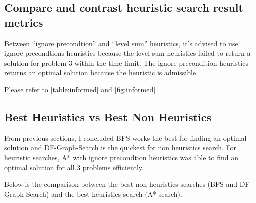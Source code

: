 \documentclass[letterpaper]{article}
\begin{document}
\subsection*{Compare and contrast heuristic search result metrics}
Between ``ignore precondtion'' and ``level sum'' heuristics, it's advised to use ignore precondtions heuristics because the level sum heuristics failed to return a solution for problem 3 within the time limit.
The ignore precondition heuristics returns an optimal solution because the heuristic is admissible.

Please refer to \autoref{table:informed} and \autoref{fig:informed}

\subsection*{Best Heuristics vs Best Non Heuristics}
From previous sections, I concluded BFS works the best for finding an optimal solution and DF-Graph-Search is the quickest for non heuristics search. For heuristic searches, A* with ignore precondtion heuristics was able to find an optimal solution for all 3 problems efficiently.

Below is the comparison between the best non heuristics searches (BFS and DF-Graph-Search) and the best heuristics search (A* search).
\end{document}
